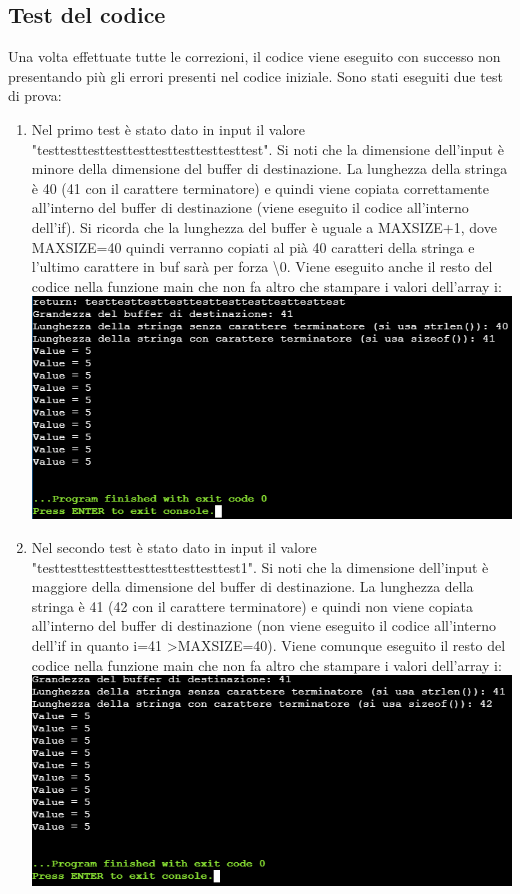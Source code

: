 \documentclass[11pt]{article} %
\begin{document}
\subsection{Test del codice}
Una volta effettuate tutte le correzioni, il codice viene eseguito con successo non presentando più gli errori presenti nel codice iniziale. Sono stati eseguiti due test di prova:
\begin{enumerate}
\item{Nel primo test è stato dato in input il valore "testtesttesttesttesttesttesttesttesttest". Si noti che la dimensione dell'input è minore della dimensione del buffer di destinazione. La lunghezza della stringa è 40 (41 con il carattere terminatore) e quindi viene copiata correttamente all'interno del buffer di destinazione (viene eseguito il codice all'interno dell'if). Si ricorda che la lunghezza del buffer è uguale a MAXSIZE+1, dove MAXSIZE=40 quindi verranno copiati al pià 40 caratteri della stringa e l'ultimo carattere in buf sarà per forza \textbackslash0. Viene eseguito anche il resto del codice nella funzione main che non fa altro che stampare i valori dell'array i: \newline \includegraphics[scale=0.8]{test1} }
\item{Nel secondo test è stato dato in input il valore "testtesttesttesttesttesttesttesttest1". Si noti che la dimensione dell'input è maggiore della dimensione del buffer di destinazione. La lunghezza della stringa è 41 (42 con il carattere terminatore) e quindi non viene copiata all'interno del buffer di destinazione (non viene eseguito il codice all'interno dell'if in quanto i=41 \textgreater MAXSIZE=40). Viene comunque eseguito il resto del codice nella funzione main che non fa altro che stampare i valori dell'array i: \newline \includegraphics[scale=0.8]{test2}}
\end{enumerate}
\end{document}

